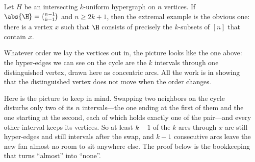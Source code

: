 \begin{boxtheorem} \label{Ch2:Thm:EKR_Extremal}
    Let $H$ be an intersecting $k$-uniform hypergraph on $n$ vertices. If $\abs{\H} = \binom{n-1}{k-1}$ and $n \geq 2k + 1$, then the extremal example is the obvious one: there is a vertex $x$ such that $\H$ consists of precisely the $k$-subsets of $[n]$ that contain $x$.
\end{boxtheorem}

\begin{figure}[H]
    \centering
\end{figure}

Whatever order we lay the vertices out in, the picture looks like the one above: the hyper-edges we can see on the cycle are the $k$ intervals through one distinguished vertex, drawn here as concentric arcs. All the work is in showing that the distinguished vertex does not move when the order changes.


Here is the picture to keep in mind. Swapping two neighbors on the cycle disturbs only two of its $n$ intervals---the one ending at the first of them and the one starting at the second, each of which holds exactly one of the pair---and every other interval keeps its vertices. So at least $k - 1$ of the $k$ arcs through $x$ are still hyper-edges and still intervals after the swap, and $k - 1$ consecutive arcs leave the new fan almost no room to sit anywhere else. The proof below is the bookkeeping that turns ``almost'' into ``none''.

\begin{figure}[H]
    \centering
\end{figure}


